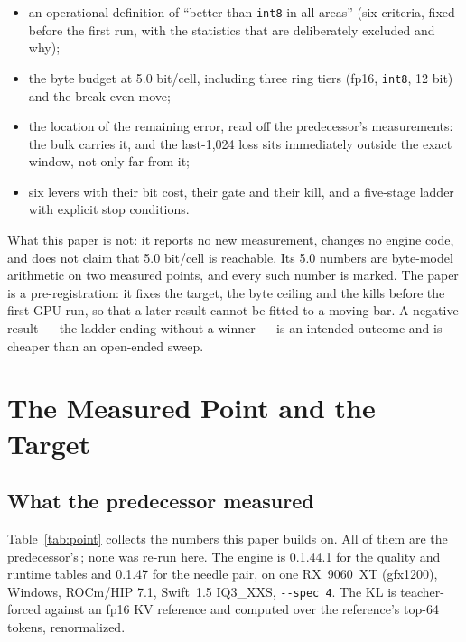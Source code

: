 \documentclass[10pt,twocolumn]{article}
\begin{document}
\begin{itemize}[leftmargin=1.2em,itemsep=0.15em,topsep=0.2em]
\item an operational definition of ``better than \texttt{int8} in all areas'' (six criteria, fixed before the first run, with the statistics that are deliberately excluded and why);
\item the byte budget at 5.0 bit/cell, including three ring tiers (fp16, \texttt{int8}, 12 bit) and the break-even move;
\item the location of the remaining error, read off the predecessor's measurements: the bulk carries it, and the last-1,024 loss sits immediately outside the exact window, not only far from it;
\item six levers with their bit cost, their gate and their kill, and a five-stage ladder with explicit stop conditions.
\end{itemize}

What this paper is not: it reports no new measurement, changes no engine code, and does not claim that 5.0 bit/cell is reachable. Its 5.0 numbers are byte-model arithmetic on two measured points, and every such number is marked. The paper is a pre-registration: it fixes the target, the byte ceiling and the kills before the first GPU run, so that a later result cannot be fitted to a moving bar. A negative result --- the ladder ending without a winner --- is an intended outcome and is cheaper than an open-ended sweep.

\section{The Measured Point and the Target}\label{sec:target}

\subsection{What the predecessor measured}

Table~\ref{tab:point} collects the numbers this paper builds on. All of them are the predecessor's\,\cite{kvwin,strata-details}; none was re-run here. The engine is 0.1.44.1 for the quality and runtime tables and 0.1.47 for the needle pair, on one RX~9060~XT (gfx1200), Windows, ROCm/HIP 7.1, Swift~1.5 IQ3\_XXS, \texttt{-{}-spec 4}. The KL is teacher-forced against an fp16 KV reference and computed over the reference's top-64 tokens, renormalized.
\end{document}
